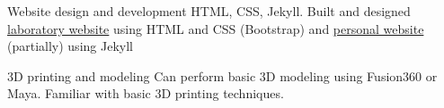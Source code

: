 

\begin{cvskills}

  \cvskill
    {Website design and development} 
    {HTML, CSS, Jekyll. Built and designed \href{http://www.protein.osaka-u.ac.jp/cell_systems}{laboratory website} using HTML and CSS (Bootstrap) and \linebreak \href{https://www.jnicolaus.com}{personal website} (partially) using Jekyll} 
    
  \cvskill
    {3D printing and modeling} %
    {Can perform basic 3D modeling using Fusion360 or Maya. Familiar with basic 3D printing techniques.} %

\end{cvskills}
